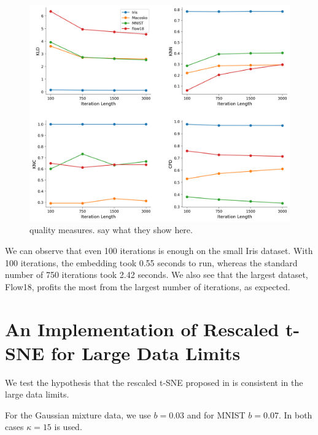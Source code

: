 \begin{figure}[h]
    \centering 
        \includegraphics[width=\linewidth]{figures/n_iter/n_iter_4_quality_measures.png}
        \caption{quality measures. say what they show here.}
    \label{fig:n_iter-quality}
\end{figure}

We can observe that even 100 iterations is enough on the small Iris dataset. 
With 100 iterations, the embedding took 0.55 seconds to run, whereas the standard number of 750 iterations took 2.42 seconds. 
We also see that the largest dataset, Flow18, profits the most from the largest number of iterations, as expected. 

\newpage 
\section{An Implementation of Rescaled t-SNE for Large Data Limits}
We test the hypothesis that the rescaled t-SNE proposed in \cite{murray2024largedatalimitsscaling} is consistent in the large data limits. 


For the Gaussian mixture data, we use $b=0.03$ and for MNIST $b=0.07$. In both cases $\kappa=15$ is used. 

